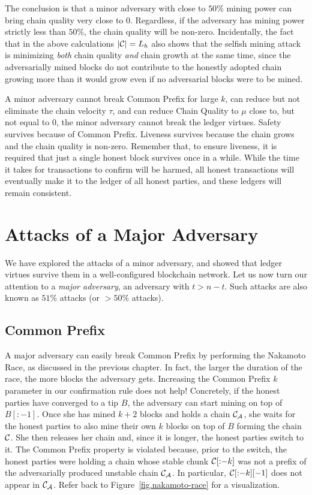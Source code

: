 The conclusion is that a minor adversary with close to $50\%$ mining power can bring
chain quality very close to $0$. Regardless, if the adversary has mining power strictly
less than $50\%$, the chain quality will be non-zero.
Incidentally, the fact that in the above calculations
$|\mathcal{C}| = L_h$ also shows that the selfish mining attack is minimizing \emph{both}
chain quality \emph{and} chain growth at the same time, since the adversarially mined
blocks do not contribute to the honestly adopted chain growing more than it would
grow even if no adversarial blocks were to be mined.

A minor adversary cannot break Common Prefix for large $k$, can reduce but not eliminate the chain velocity
$\tau$, and can reduce Chain Quality to $\mu$ close to, but not equal to $0$, the minor adversary cannot
break the ledger virtues. Safety survives because of Common Prefix. Liveness survives because the chain grows
and the chain quality is non-zero. Remember that, to ensure liveness, it is required that just a single honest
block survives once in a while. While the time it takes for transactions to confirm will be harmed, all honest
transactions will eventually make it to the ledger of all honest parties, and these ledgers will remain
consistent.

\section{Attacks of a Major Adversary}
We have explored the attacks of a minor adversary, and showed that ledger virtues survive them in a
well-configured blockchain network. Let us now turn our attention to a \emph{major adversary}, an
adversary with $t > n - t$. Such attacks are also known as $51\%$ attacks (or $> 50\%$ attacks).

\subsection*{Common Prefix}
A major adversary can easily break Common Prefix by performing the Nakamoto Race, as discussed
in the previous chapter. In fact, the larger the duration of the race, the more blocks the adversary
gets. Increasing the Common Prefix $k$ parameter in our confirmation rule does not help!
Concretely,
if the honest parties have converged to a tip $B$, the adversary can start mining on top of
$B[{:}{-1}]$. Once she has mined $k + 2$ blocks and holds a chain $\mathcal{C}_\mathcal{A}$,
she waits for the honest parties to also mine their own $k$ blocks on top of $B$
forming the chain $\mathcal{C}$.
She then releases her chain and, since it is longer, the honest parties switch to it.
The Common Prefix property is violated because, prior to the switch, the honest parties
were holding a chain whose stable chunk $\mathcal{C}[{:}{-k}]$ was not a prefix of the
adversarially produced unstable chain $\mathcal{C}_\mathcal{A}$. In particular,
$\mathcal{C}[{:}{-k}][-1]$ does not appear in $\mathcal{C}_\mathcal{A}$. Refer back to
Figure~\ref{fig.nakamoto-race}
for a visualization.


